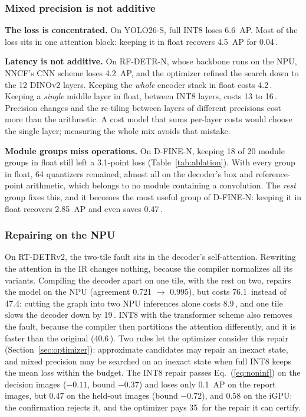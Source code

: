 \documentclass[conference]{IEEEtran}
\newcommand{\ms}{\,\text{ms}}
\begin{document}
\subsubsection{Mixed precision is not additive}
\label{sec:case-mixed}
\textbf{The loss is concentrated.} On YOLO26-S, full INT8 loses 6.6~AP. Most of the loss sits in one attention block: keeping it in float recovers 4.5~AP for 0.04\ms{}.

\textbf{Latency is not additive.} On RF-DETR-N, whose backbone runs on the NPU, NNCF's CNN scheme loses 4.2~AP, and the optimizer refined the search down to the 12 DINOv2 layers. Keeping the \emph{whole} encoder stack in float costs 4.2\ms{}. Keeping a \emph{single} middle layer in float, between INT8 layers, costs 13 to 16\ms{}. Precision changes and the re-tiling between layers of different precisions cost more than the arithmetic. A cost model that sums per-layer costs would choose the single layer; measuring the whole mix avoids that mistake.

\textbf{Module groups miss operations.} On D-FINE-N, keeping 18 of 20 module groups in float still left a 3.1-point loss (Table~\ref{tab:ablation}). With every group in float, 64 quantizers remained, almost all on the decoder's box and reference-point arithmetic, which belongs to no module containing a convolution. The \emph{rest} group fixes this, and it becomes the most useful group of D-FINE-N: keeping it in float recovers 2.85~AP and even saves 0.47\ms{}.

\subsubsection{Repairing on the NPU}
\label{sec:case-repair}
On RT-DETRv2, the two-tile fault sits in the decoder's self-attention. Rewriting the attention in the IR changes nothing, because the compiler normalizes all its variants. Compiling the decoder apart on one tile, with the rest on two, repairs the model on the NPU (agreement 0.721 $\to$ 0.995), but costs 76.1\ms{} instead of 47.4: cutting the graph into two NPU inferences alone costs 8.9\ms{}, and one tile slows the decoder down by 19\ms{}. INT8 with the transformer scheme also removes the fault, because the compiler then partitions the attention differently, and it is faster than the original (40.6\ms{}). Two rules let the optimizer consider this repair (Section~\ref{sec:optimizer}): approximate candidates may repair an inexact state, and mixed precision may be searched on an inexact state when full INT8 keeps the mean loss within the budget. The INT8 repair passes Eq.~(\ref{eq:noninf}) on the decision images ($-0.11$, bound $-0.37$) and loses only 0.1~AP on the report images, but 0.47 on the held-out images (bound $-0.72$), and 0.58 on the iGPU: the confirmation rejects it, and the optimizer pays 35\ms{} for the repair it can certify.
\end{document}
